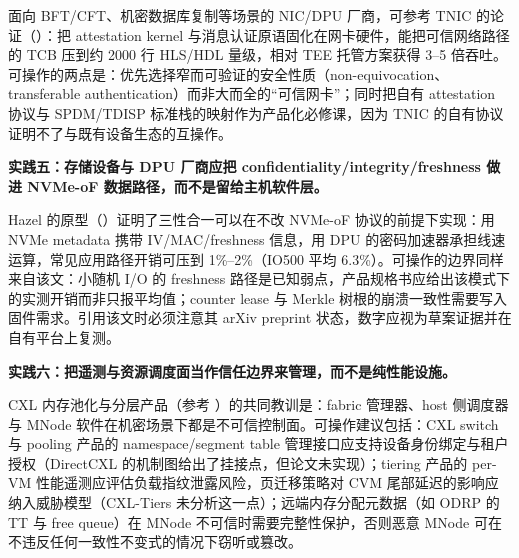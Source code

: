 \documentclass[11pt]{ctexart}
\begin{document}
面向 BFT/CFT、机密数据库复制等场景的 NIC/DPU 厂商，可参考 TNIC 的论证（\cite{giantsidi2025tnic}）：把 attestation kernel 与消息认证原语固化在网卡硬件，能把可信网络路径的 TCB 压到约 2000 行 HLS/HDL 量级，相对 TEE 托管方案获得 3--5 倍吞吐。可操作的两点是：优先选择窄而可验证的安全性质（non-equivocation、transferable authentication）而非大而全的“可信网卡”；同时把自有 attestation 协议与 SPDM/TDISP 标准栈的映射作为产品化必修课，因为 TNIC 的自有协议证明不了与既有设备生态的互操作。\par
\noindent\textbf{实践五：存储设备与 DPU 厂商应把 confidentiality/integrity/freshness 做进 NVMe-oF 数据路径，而不是留给主机软件层。}\par
Hazel 的原型（\cite{chrapek2026hazel}）证明了三性合一可以在不改 NVMe-oF 协议的前提下实现：用 NVMe metadata 携带 IV/MAC/freshness 信息，用 DPU 的密码加速器承担线速运算，常见应用路径开销可压到 1\%--2\%（IO500 平均 6.3\%）。可操作的边界同样来自该文：小随机 I/O 的 freshness 路径是已知弱点，产品规格书应给出该模式下的实测开销而非只报平均值；counter lease 与 Merkle 树根的崩溃一致性需要写入固件需求。引用该文时必须注意其 arXiv preprint 状态，数字应视为草案证据并在自有平台上复测。\par
\noindent\textbf{实践六：把遥测与资源调度面当作信任边界来管理，而不是纯性能设施。}\par
CXL 内存池化与分层产品（参考 \cite{gouk2022directcxl,zhong2024cxltiers,wang2025odrp}）的共同教训是：fabric 管理器、host 侧调度器与 MNode 软件在机密场景下都是不可信控制面。可操作建议包括：CXL switch 与 pooling 产品的 namespace/segment table 管理接口应支持设备身份绑定与租户授权（DirectCXL 的机制图给出了挂接点，但论文未实现）；tiering 产品的 per-VM 性能遥测应评估负载指纹泄露风险，页迁移策略对 CVM 尾部延迟的影响应纳入威胁模型（CXL-Tiers 未分析这一点）；远端内存分配元数据（如 ODRP 的 TT 与 free queue）在 MNode 不可信时需要完整性保护，否则恶意 MNode 可在不违反任何一致性不变式的情况下窃听或篡改。\par
\end{document}
